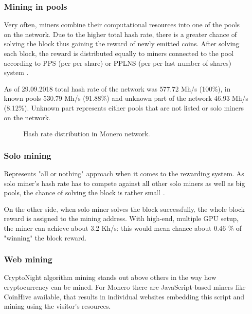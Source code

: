 \documentclass[
  printed, %
  table,   %
  lof,     %
  lot,     %
           oneside, color
]{fithesis3}
\begin{document}
\subsubsection{Mining in pools}
\label{cha:poolmining}
Very often, miners combine their computational resources into one of the pools on the network. Due to the higher total hash rate, there is a greater chance of solving the block thus gaining the reward of newly emitted coins. After solving each block, the reward is distributed equally to miners connected to the pool according to PPS (per-per-share) or PPLNS (per-per-last-number-of-shares) system \cite{tarasiewicz2015cryptocurrencies}.

As of 29.09.2018 total hash rate of the network was 577.72 Mh/s (100\%), in known pools 530.79 Mh/s (91.88\%) and unknown part of the network 46.93 Mh/s (8.12\%). Unknown part represents either pools that are not listed or solo miners on the network.


\begin{figure}[H]
\begin{center}
     \end{center}
      \caption{Hash rate distribution in Monero network.}
      \label{chart:range}

\end{figure}
\subsubsection{Solo mining}
Represents "all or nothing" approach when it comes to the rewarding system. As solo miner's hash rate has to compete against all other solo miners as well as big pools, the chance of solving the block is rather small \cite{cong2018decentralized}.

On the other side, when solo miner solves the block successfully, the whole block reward is assigned to the mining address. With high-end, multiple GPU setup, the miner can achieve about 3.2 Kh/s; this would mean chance about 0.46 \% of "winning" the block reward. 

\subsubsection{Web mining}
\label{cpumining}
CryptoNight algorithm mining stands out above others in the way how cryptocurrency can be mined. For Monero there are JavaScript-based miners like CoinHive available, that results in individual websites embedding this script and mining using the visitor's resources. 
\end{document}
